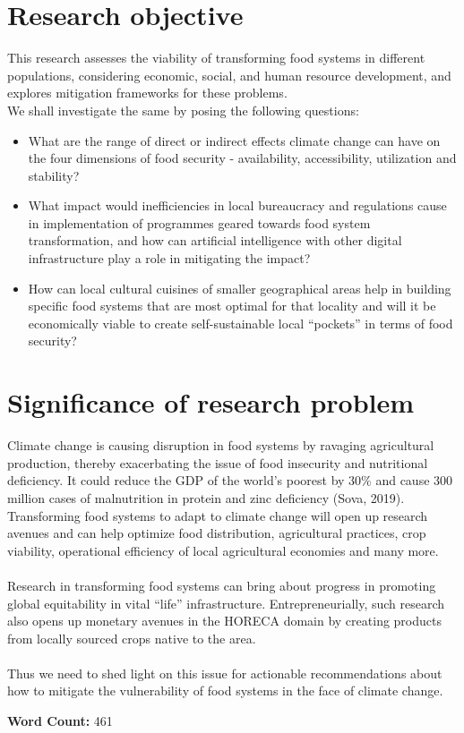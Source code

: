 \documentclass[12pt, twoside]{report}
\begin{document}
\begin{multicols}{2}
\section*{Research objective}%
This research assesses the viability of transforming food systems in different populations, considering economic, social, and human resource development, and explores mitigation frameworks for these problems. \\ 
We shall investigate the same by posing the following questions:
\begin{itemize}
	\item What are the range of direct or indirect effects climate change can have on the four dimensions of food security - availability, accessibility, utilization and stability?
	\item What impact would inefficiencies in local bureaucracy and regulations cause in implementation of programmes geared towards food system transformation, and how can artificial intelligence with other digital infrastructure play a role in mitigating the impact?
	\item How can local cultural cuisines of smaller geographical areas help in building specific food systems that are most optimal for that locality and will it be economically viable to create self-sustainable local “pockets” in terms of food security?
\end{itemize}

\section*{Significance of research problem}%
Climate change is causing disruption in food systems by ravaging agricultural production, thereby exacerbating the issue of food insecurity and nutritional deficiency. It could reduce the GDP of the world’s poorest by $ 30 \% $ and cause $ 300 $ million cases of malnutrition in protein and zinc deficiency (Sova, 2019). \\
Transforming food systems to adapt to climate change will open up research avenues and can help optimize food distribution, agricultural practices, crop viability, operational efficiency of local agricultural economies and many more. \\ \\
Research in transforming food systems can bring about progress in promoting global equitability in vital ``life'' infrastructure. Entrepreneurially, such research also opens up monetary avenues in the HORECA domain by creating products from locally sourced crops native to the area. \\ \\
Thus we need to shed light on this issue for actionable recommendations about how to mitigate the vulnerability of food systems in the face of climate change.

\end{multicols}

\flushright
\textbf{Word Count:} 461



\nocite{gregory2005}
\nocite{sova2019}
\nocite{wheeler2013}
\end{document}
